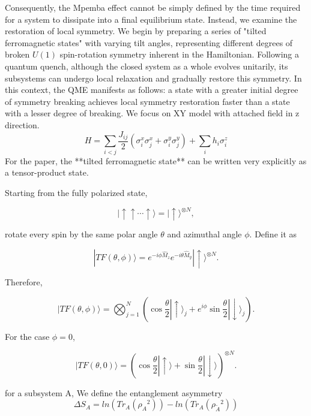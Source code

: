 \documentclass[10pt,a4paper,twocolumn]{article}
\begin{document}
 Consequently, the Mpemba effect cannot be simply defined by the time required for a system to dissipate into a final equilibrium state. Instead, we examine the restoration of local symmetry. We begin by preparing a series of "tilted ferromagnetic states" with varying tilt angles, representing different degrees of broken $U(1)$ spin-rotation symmetry inherent in the Hamiltonian. Following a quantum quench, although the closed system as a whole evolves unitarily, its subsystems can undergo local relaxation and gradually restore this symmetry. In this context, the QME manifests as follows: a state with a greater initial degree of symmetry breaking achieves local symmetry restoration faster than a state with a lesser degree of breaking.
 We focus on XY model with attached field in z direction.
\begin{equation}
	H = \sum_{i<j}\frac{J_{ij}}{2}\left(\sigma_i^x\sigma_j^x+\sigma_i^y\sigma_j^y\right)
	+ \sum_i h_i\sigma_i^z
\end{equation}
 For the paper, the **tilted ferromagnetic state** can be written very explicitly as a tensor-product state.
 
 Starting from the fully polarized state,
 
 $$
 |\uparrow\uparrow\cdots\uparrow\rangle
 =
 |\uparrow\rangle^{\otimes N},
 $$
 
 rotate every spin by the same polar angle \(\theta\) and azimuthal angle \(\phi\).   Define  it as
 
 $$
 |TF(\theta,\phi)\rangle
 =
 e^{-i\phi \hat M_z}
 e^{-i\theta \hat M_y}
 |\uparrow\rangle^{\otimes N}.
 $$
 
 
 
 
 
 
 Therefore,
 
 $$
 	|TF(\theta,\phi)\rangle
 	=
 	\bigotimes_{j=1}^{N}
 	\left(
 	\cos\frac{\theta}{2}|\uparrow\rangle_j
 	+
 	e^{i\phi}\sin\frac{\theta}{2}|\downarrow\rangle_j
 	\right).
 $$
 
 For the case   \(\phi=0\),
 
 $$
 	|TF(\theta,0)\rangle
 	=
 	\left(
 	\cos\frac{\theta}{2}|\uparrow\rangle
 	+
 	\sin\frac{\theta}{2}|\downarrow\rangle
 	\right)^{\otimes N}.
 $$
 
 
 
for a subsystem A,
 We define the entanglement asymmetry 
 \begin{equation}
 	\Delta S_{A}=ln(Tr_{A}({\rho_A}^2))-ln(Tr_{A}({\rho_{\tilde{A}}}^2))
 \end{equation}
 
\end{document}
